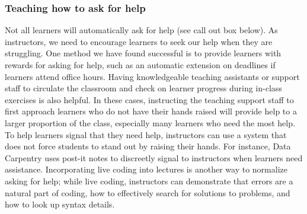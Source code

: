 \subsubsection{Teaching how to ask for help}
Not all learners will automatically ask for help (see call out box below). 
As instructors, we need to encourage learners to seek our help when they are struggling.
One method we have found successful is to provide learners with rewards for asking for help, such as an automatic extension on deadlines if learners attend office hours.
Having knowledgeable teaching assistants or support staff to circulate the classroom and check on learner progress during in-class exercises is also helpful. 
In these cases, instructing the teaching support staff to first approach learners who do not have their hands raised will provide help to a larger proportion of the class, especially many learners who need the most help.
To help learners signal that they need help, instructors can use a system that does not force students to stand out by raising their hands. For instance, Data Carpentry uses post-it notes to discreetly signal to instructors when learners need assistance.
Incorporating live coding into lectures is another way to normalize asking for help; while live coding, instructors can demonstrate that errors are a natural part of coding, how to effectively search for solutions to problems, and how to look up syntax details.

{}

